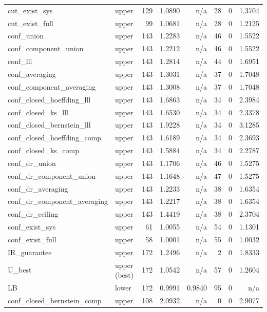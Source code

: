 \begin{table}[htbp]
\begin{tabular}{llrrrrrr}
cut\_exist\_sys & upper & 129 & 1.0890 & n/a & 28 & 0 & 1.3704 \\
cut\_exist\_full & upper & 99 & 1.0681 & n/a & 28 & 0 & 1.2125 \\
conf\_union & upper & 143 & 1.2283 & n/a & 46 & 0 & 1.5522 \\
conf\_component\_union & upper & 143 & 1.2212 & n/a & 46 & 0 & 1.5522 \\
conf\_lll & upper & 143 & 1.2814 & n/a & 44 & 0 & 1.6951 \\
conf\_averaging & upper & 143 & 1.3031 & n/a & 37 & 0 & 1.7048 \\
conf\_component\_averaging & upper & 143 & 1.3008 & n/a & 37 & 0 & 1.7048 \\
conf\_closed\_hoeffding\_lll & upper & 143 & 1.6863 & n/a & 34 & 0 & 2.3984 \\
conf\_closed\_ks\_lll & upper & 143 & 1.6530 & n/a & 34 & 0 & 2.3378 \\
conf\_closed\_bernstein\_lll & upper & 143 & 1.9228 & n/a & 34 & 0 & 3.1285 \\
conf\_closed\_hoeffding\_comp & upper & 143 & 1.6189 & n/a & 34 & 0 & 2.3693 \\
conf\_closed\_ks\_comp & upper & 143 & 1.5884 & n/a & 34 & 0 & 2.2787 \\
conf\_dr\_union & upper & 143 & 1.1706 & n/a & 46 & 0 & 1.5275 \\
conf\_dr\_component\_union & upper & 143 & 1.1648 & n/a & 47 & 0 & 1.5275 \\
conf\_dr\_averaging & upper & 143 & 1.2233 & n/a & 38 & 0 & 1.6354 \\
conf\_dr\_component\_averaging & upper & 143 & 1.2217 & n/a & 38 & 0 & 1.6354 \\
conf\_dr\_ceiling & upper & 143 & 1.4419 & n/a & 38 & 0 & 2.3704 \\
conf\_exist\_sys & upper & 61 & 1.0055 & n/a & 54 & 0 & 1.1301 \\
conf\_exist\_full & upper & 58 & 1.0001 & n/a & 55 & 0 & 1.0032 \\
IR\_guarantee & upper & 172 & 1.2496 & n/a & 2 & 0 & 1.8333 \\
U\_best & upper (best) & 172 & 1.0542 & n/a & 57 & 0 & 1.2604 \\
LB & lower & 172 & 0.9991 & 0.9840 & 95 & 0 & n/a \\
conf\_closed\_bernstein\_comp & upper & 108 & 2.0932 & n/a & 0 & 0 & 2.9077 \\
\bottomrule
\end{tabular}
\end{table}

